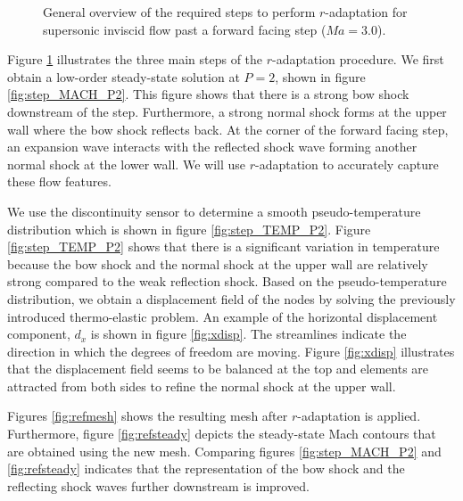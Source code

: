 \documentclass[review]{elsarticle}
\begin{document}
\begin{figure}[!htbp]
\begin{center}
{}
\caption{General overview of the required steps to perform $r$-adaptation for supersonic inviscid flow past a forward facing step ($Ma=3.0$).}
\label{fig:radaptsteps}
\end{center}
\end{figure}
Figure \ref{fig:radaptsteps} illustrates the three main steps of the $r$-adaptation procedure.
We first obtain a low-order steady-state solution at $P=2$, shown in figure \ref{fig:step_MACH_P2}.
This figure shows that there is a strong bow shock downstream of the step. 
Furthermore, a strong normal shock forms at the upper wall where the bow shock reflects back. 
At the corner of the forward facing step, an expansion wave interacts with the 
reflected shock wave forming another normal shock at the lower wall.
We will use $r$-adaptation to accurately capture these flow features.
\par We use the discontinuity sensor to determine a smooth pseudo-temperature distribution which is shown in figure \ref{fig:step_TEMP_P2}.
Figure \ref{fig:step_TEMP_P2} shows that there is a significant variation in temperature because the bow shock and the normal shock at the upper wall are relatively strong compared to the weak reflection shock.
Based on the pseudo-temperature distribution, we obtain a displacement field of the nodes by solving the previously introduced thermo-elastic problem.
An example of the horizontal displacement component, $d_x$ is shown in figure \ref{fig:xdisp}. 
The streamlines indicate the direction in which the degrees of freedom are moving. 
Figure \ref{fig:xdisp} illustrates that the displacement field seems to be balanced at the top and elements are attracted from both sides to refine the normal shock at the upper wall.
\par Figures \ref{fig:refmesh} shows the resulting mesh after $r$-adaptation is applied. 
Furthermore, figure \ref{fig:refsteady} depicts the steady-state Mach contours that are obtained using the new mesh. 
Comparing figures \ref{fig:step_MACH_P2} and \ref{fig:refsteady} indicates that the representation of the bow shock and the reflecting shock waves further downstream is improved.
\end{document}
